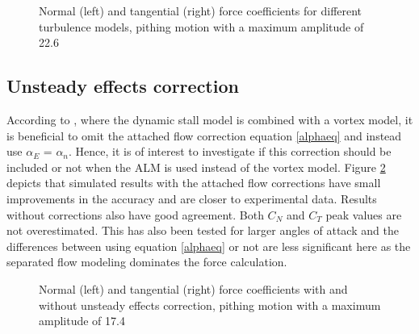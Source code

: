 \documentclass[a4paper]{jpconf}
\begin{document}
\begin{figure}[h]
\begin{minipage}{18pc}
\resizebox{\columnwidth}{!}{}
\end{minipage}\hspace{2pc}%
\begin{minipage}{18pc}
\resizebox{\columnwidth}{!}{}
\end{minipage}
\caption{\label{RANSLES}Normal (left) and tangential (right) force coefficients for different turbulence models, pithing motion with a maximum amplitude of 22.6\degree\ }
\end{figure}

\subsection{Unsteady effects correction}


According to \cite{dyachuk2015simulating}, where the dynamic stall model is combined with a vortex model, it is beneficial to omit the attached flow correction equation \ref{alphaeq} and instead use $\alpha_E$ = $\alpha_n$. Hence, it is of interest to investigate if this correction should be included or not when the ALM is used instead of the vortex model. Figure \ref{AMP174corrections} depicts that simulated results with the attached flow corrections have small improvements in the accuracy and are closer to experimental data. Results without corrections also have good agreement. Both $C_N$ and $C_T$ peak values are not overestimated. This has also been tested for larger angles of attack and the differences between using equation \ref{alphaeq} or not are less significant here as the separated flow modeling dominates the force calculation.  

\begin{figure}[h]
\begin{minipage}{18pc}
\resizebox{\columnwidth}{!}{}
\end{minipage}\hspace{2pc}%
\begin{minipage}{18pc}
\resizebox{\columnwidth}{!}{}
\end{minipage}
\caption{\label{AMP174corrections}Normal (left) and tangential (right) force coefficients with and without unsteady effects correction, pithing motion with a maximum amplitude of 17.4\degree\ }
\end{figure}
\end{document}

